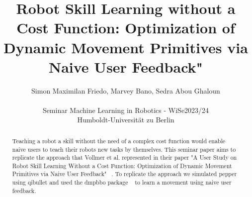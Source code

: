 \documentclass{article}
\title{Robot Skill Learning without a Cost Function: Optimization of Dynamic Movement Primitives via Naive User Feedback"}
\author{Simon Maximilan Friedo, Marvey Bano, Sedra Abou Ghaloun\\\\Seminar Machine Learning in Robotics - WiSe2023/24\\Humboldt-Universit\"at zu Berlin}
\begin{document}
    \maketitle

    \begin{abstract}
        Teaching a robot a skill without the need of a complex cost function would enable naive users to teach their robots
        new tasks by themselves.
        This seminar paper aims to replicate the approach that Vollmer et al. represented in their paper "A User Study on Robot Skill
        Learning Without a Cost Function: Optimization of Dynamic Movement Primitives via Naive User Feedback" ~\cite{vollmer2018}.
        To replicate the approach we simulated pepper using qibullet and used the dmpbbo package ~\cite{stulp2019dmpbbo} to learn
        a movement using naive user feedback.
    \end{abstract}
\end{document}
